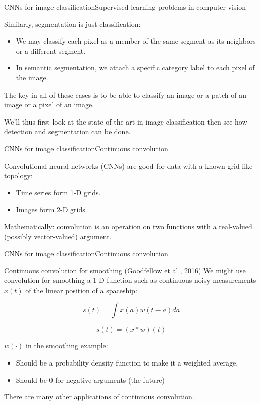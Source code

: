 \documentclass{beamer}
\begin{document}
\begin{frame}{CNNs for image classification}{Supervised learning problems
  in computer vision}

  Similarly, \alert{segmentation is just classification}:
  \begin{itemize}
  \item We may classify each \alert{pixel} as a member of the same
    segment as its neighbors or a different segment.
  \item In \alert{semantic segmentation}, we attach a specific
    \alert{category label} to each pixel of the image.
  \end{itemize}
  
  \medskip

  The key in all of these cases is to be able to classify an image or
  a patch of an image or a pixel of an image.

  \medskip

  We'll thus first look at the state of the art in image classification
  then see how detection and segmentation can be done.

\end{frame}


\begin{frame}{CNNs for image classification}{Continuous convolution}

  \alert{Convolutional neural networks} (CNNs) are good for data with
  a known grid-like topology:
\begin{itemize}
\item Time series form 1-D grids.
\item Images form 2-D grids.
\end{itemize}

Mathematically: convolution is an operation on \alert{two functions}
with a \alert{real-valued} (possibly vector-valued) argument.

\end{frame}


\begin{frame}{CNNs for image classification}{Continuous convolution}

\begin{block}{Continuous convolution for smoothing (Goodfellow et al., 2016)}
We might use convolution for smoothing a 1-D function such as
continuous noisy measurements $x(t)$ of the linear position of a
spaceship:

$$ s(t) = \int x(a) w(t-a) da $$

$$ s(t) = (x * w)(t) $$

\end{block}

$w(\cdot)$ in the smoothing example:
\begin{itemize}
  \item Should be a
\alert{probability density function} to make it a \alert{weighted average}.
\item Should be \alert{0} for negative arguments (the future)
\end{itemize}

\medskip

There are many other applications of continuous convolution.

\end{frame}
\end{document}

